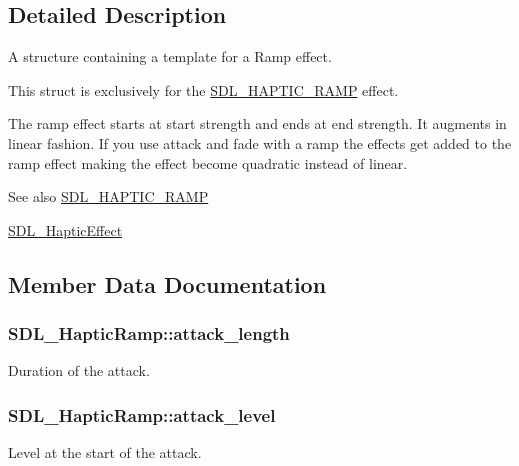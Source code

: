 \subsection{Detailed Description}
A structure containing a template for a Ramp effect. 

This struct is exclusively for the \hyperlink{_s_d_l__haptic_8h_af10eb937a64a8f602e9c46682ac0d868}{S\+D\+L\+\_\+\+H\+A\+P\+T\+I\+C\+\_\+\+R\+A\+M\+P} effect.

The ramp effect starts at start strength and ends at end strength. It augments in linear fashion. If you use attack and fade with a ramp the effects get added to the ramp effect making the effect become quadratic instead of linear.

\begin{DoxySeeAlso}{See also}
\hyperlink{_s_d_l__haptic_8h_af10eb937a64a8f602e9c46682ac0d868}{S\+D\+L\+\_\+\+H\+A\+P\+T\+I\+C\+\_\+\+R\+A\+M\+P} 

\hyperlink{union_s_d_l___haptic_effect}{S\+D\+L\+\_\+\+Haptic\+Effect} 
\end{DoxySeeAlso}


\subsection{Member Data Documentation}
\hypertarget{struct_s_d_l___haptic_ramp_adbcd7ffb05016d442c73e81cc0fcbbd2}{}
\subsubsection[{attack\+\_\+length}]{ S\+D\+L\+\_\+\+Haptic\+Ramp\+::attack\+\_\+length}\label{struct_s_d_l___haptic_ramp_adbcd7ffb05016d442c73e81cc0fcbbd2}
Duration of the attack. \hypertarget{struct_s_d_l___haptic_ramp_a755933bbda14ae9b53c574b9fe6291a0}{}
\subsubsection[{attack\+\_\+level}]{ S\+D\+L\+\_\+\+Haptic\+Ramp\+::attack\+\_\+level}\label{struct_s_d_l___haptic_ramp_a755933bbda14ae9b53c574b9fe6291a0}
Level at the start of the attack. \hypertarget{struct_s_d_l___haptic_ramp_a2027c6fd88f1ebe652c90c71410ee0bf}{}
